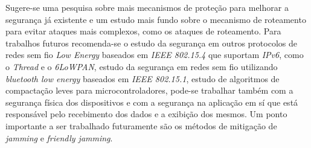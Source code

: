 \par Sugere-se uma pesquisa sobre mais mecanismos de prote\c{c}\~ao para melhorar a seguran\c{c}a j\'a existente e um estudo mais fundo sobre o mecanismo de roteamento para evitar ataques mais complexos, como os ataques de roteamento. Para trabalhos futuros recomenda-se o estudo da seguran\c{c}a em outros protocolos de redes sem fio \emph{Low Energy} baseados em \emph{IEEE 802.15.4} que suportam \emph{IPv6}, como o \emph{Thread} e o \emph{6LoWPAN}, estudo da seguran\c{c}a em redes sem fio utilizando \emph{bluetooth low energy} baseados em \emph{IEEE 802.15.1}, estudo de algoritmos de compacta\c{c}\~ao leves para microcontroladores, pode-se trabalhar tamb\'em com a seguran\c{c}a f\'isica dos dispositivos e com a seguran\c{c}a na aplica\c{c}\~ao em s\'i que est\'a respons\'avel pelo recebimento dos dados e a exibi\c{c}\~ao dos mesmos. Um ponto importante a ser trabalhado futuramente s\~ao os m\'etodos de mitiga\c{c}\~ao de \emph{jamming} e \emph{friendly jamming}.